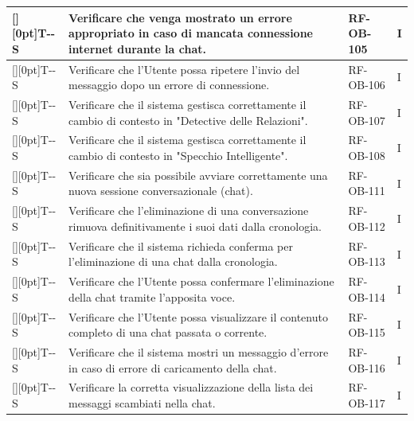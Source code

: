 \documentclass[a4paper,12pt]{article}
\newcounter{testsys}
\newcommand{\systestcode}{%
  \raisebox{0pt}[\height][0pt]{\hypertarget{T-\arabic{testsys}-S}{}}T-\arabic{testsys}-S%
}
\begin{document}
\begin{longtable}{| >{\centering\arraybackslash}p{} | >{\raggedright\arraybackslash}p{} | >{\centering\arraybackslash}p{} | >{\centering\arraybackslash}p{} |}
\stepcounter{testsys} \systestcode & Verificare che venga mostrato un errore appropriato in caso di mancata connessione internet durante la chat. & RF-OB-105 & I \\
\hline

\stepcounter{testsys} \systestcode & Verificare che l'Utente possa ripetere l'invio del messaggio dopo un errore di connessione. & RF-OB-106 & I \\
\hline

\stepcounter{testsys} \systestcode & Verificare che il sistema gestisca correttamente il cambio di contesto in "Detective delle Relazioni". & RF-OB-107 & I \\
\hline

\stepcounter{testsys} \systestcode & Verificare che il sistema gestisca correttamente il cambio di contesto in "Specchio Intelligente". & RF-OB-108 & I \\
\hline

\stepcounter{testsys} \systestcode & Verificare che sia possibile avviare correttamente una nuova sessione conversazionale (chat). & RF-OB-111 & I \\
\hline

\stepcounter{testsys} \systestcode & Verificare che l'eliminazione di una conversazione rimuova definitivamente i suoi dati dalla cronologia. & RF-OB-112 & I \\
\hline

\stepcounter{testsys} \systestcode & Verificare che il sistema richieda conferma per l'eliminazione di una chat dalla cronologia. & RF-OB-113 & I \\
\hline

\stepcounter{testsys} \systestcode & Verificare che l'Utente possa confermare l'eliminazione della chat tramite l'apposita voce. & RF-OB-114 & I \\
\hline

\stepcounter{testsys} \systestcode & Verificare che l'Utente possa visualizzare il contenuto completo di una chat passata o corrente. & RF-OB-115 & I \\
\hline

\stepcounter{testsys} \systestcode & Verificare che il sistema mostri un messaggio d'errore in caso di errore di caricamento della chat. & RF-OB-116 & I \\
\hline

\stepcounter{testsys} \systestcode & Verificare la corretta visualizzazione della lista dei messaggi scambiati nella chat. & RF-OB-117 & I \\
\hline


\end{longtable}
\end{document}
